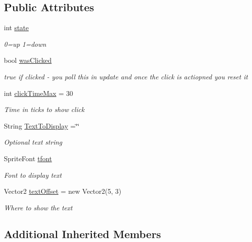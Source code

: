 \subsection*{Public Attributes}
\begin{DoxyCompactItemize}
\item 
int \mbox{\hyperlink{class_r_c___framework_1_1_button_s_i_a7276e83d5155487cc26b770d71beab2c}{state}}
\begin{DoxyCompactList}\small\item\em 0=up 1=down \end{DoxyCompactList}\item 
bool \mbox{\hyperlink{class_r_c___framework_1_1_button_s_i_af137c098b87fc391e613d52ba00db7e4}{was\+Clicked}}
\begin{DoxyCompactList}\small\item\em true if clicked -\/ you poll this in update and once the click is actiopned you reset it \end{DoxyCompactList}\item 
int \mbox{\hyperlink{class_r_c___framework_1_1_button_s_i_af149eec1943e7fc1e6602bf0bb81af57}{click\+Time\+Max}} = 30
\begin{DoxyCompactList}\small\item\em Time in ticks to show click \end{DoxyCompactList}\item 
String \mbox{\hyperlink{class_r_c___framework_1_1_button_s_i_a8269aae4c3e59b9b784ce4f0bcd092a7}{Text\+To\+Display}} =\char`\"{}\char`\"{}
\begin{DoxyCompactList}\small\item\em Optional text string \end{DoxyCompactList}\item 
Sprite\+Font \mbox{\hyperlink{class_r_c___framework_1_1_button_s_i_a9e1b4799a8570e57594d051479ead0f0}{tfont}}
\begin{DoxyCompactList}\small\item\em Font to display text \end{DoxyCompactList}\item 
Vector2 \mbox{\hyperlink{class_r_c___framework_1_1_button_s_i_a829f3c4b72f84fcecb06422f526d5c86}{text\+Offset}} = new Vector2(5, 3)
\begin{DoxyCompactList}\small\item\em Where to show the text \end{DoxyCompactList}\end{DoxyCompactItemize}
\subsection*{Additional Inherited Members}


